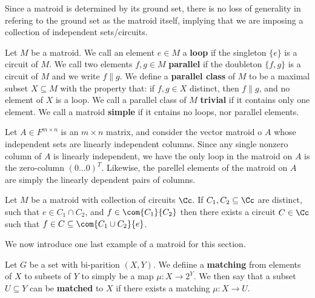 Since a matroid is determined by its ground set, there is no loss of generality
in refering to the ground set as the matroid itself, implying that we are
imposing a collection of independent sets/circuits.

\begin{definition}
    Let $M$ be a matroid. We call an element $e \in M$ a  \textbf{loop} if the
    singleton $\{e\}$ is a circuit of $M$. We call two elements  $f,g \in M$
     \textbf{parallel} if the doubleton $\{f,g\}$ is a circuit of $M$ and we
     write  $f\|g$. We define a \textbf{parallel class} of $M$ to be a maximal
     subset  $X \subseteq M$ with the property that: if  $f,g \in X$ distinct,
     then $f\|g$, and no element of  $X$ is a loop. We call a parallel class of
     $M$  \textbf{trivial} if it contains only one element. We call a matroid
     \textbf{simple} if it cntains no loops, nor parallel elements.
\end{definition}

\begin{example}\label{1.7}
    Let $A \in F^{m \times n}$ is an $m \times n$ matrix, and consider the
    vector matroid o $A$ whose independent sets are linearly independent
    columns. Since any single nonzero column of  $A$ is linearly independent, we
    have the only loop in the matroid on  $A$ is the zero-column
    $(0 \dots 0)^T$. Likewise, the parellel elements of the matroid on $A$ are
    simply the linearly dependent pairs of columns.
\end{example}

\begin{theorem}\label{1.1.5}
    Let $M$ be a matroid with collection of circuits  $\Cc$. If  $C_1, C_2
    \subseteq \Cc$ are distinct, such that $e \in C_1 \cap C_2$, and $f \in
    \com{C_1}{C_2}$ then there exists a circuit $C \in \Cc$ such that  $f \in C
    \subseteq \com{C_1 \cup C_2}{e}$.
\end{theorem}

We now introduce one last example of a matroid for this section.

\begin{definition}
    Let $G$ be a set with bi-parition  $(X,Y)$. We defiine a \textbf{matching}
    from elements of $X$ to subsets of  $Y$ to simply be a map
    $\mu:X \rightarrow 2^Y$. We then say that a subset $U \subseteq Y$ can be
    \textbf{matched} to $X$ if there exists a matching  $\mu:X \rightarrow U$.
\end{definition}

